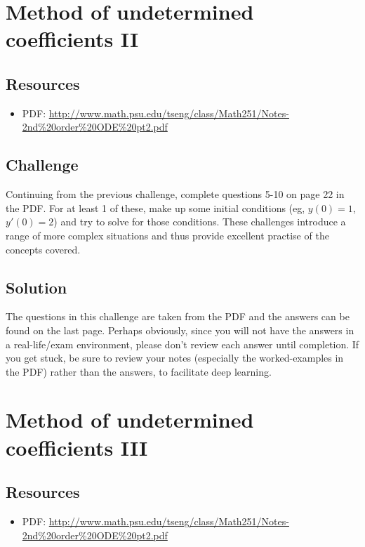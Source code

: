 \newpage
\section{Method of undetermined coefficients II}

\subsection*{Resources}
\begin{itemize}
    \item PDF: \url{http://www.math.psu.edu/tseng/class/Math251/Notes-2nd\%20order\%20ODE\%20pt2.pdf}
\end{itemize}

\subsection*{Challenge}
Continuing from the previous challenge, complete questions 5-10 on page 22 in the PDF. For at least 1 of these, make up some initial conditions (eg, $y(0)=1$, $y'(0)=2$) and try to solve for those conditions. These challenges introduce a range of more complex situations and thus provide excellent practise of the concepts covered. 

\subsection*{Solution}
The questions in this challenge are taken from the PDF and the answers can be found on the last page. Perhaps obviously, since you will not have the answers in a real-life/exam environment, please don't review each answer until completion. If you get stuck, be sure to review your notes (especially the worked-examples in the PDF) rather than the answers, to facilitate deep learning. 




\newpage
\section{Method of undetermined coefficients III}

\subsection*{Resources}
\begin{itemize}
    \item PDF: \url{http://www.math.psu.edu/tseng/class/Math251/Notes-2nd\%20order\%20ODE\%20pt2.pdf}
\end{itemize}

